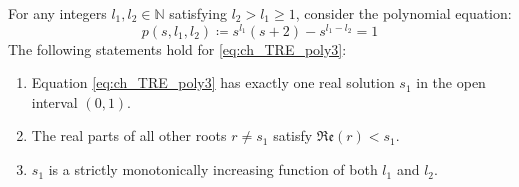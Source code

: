 \begin{lemma}\label{Lemma:ch_TRE_poly3}
For any integers $l_1, l_2 \in \mathbb{N}$ satisfying $l_2 > l_1 \ge 1$, consider the polynomial equation:
\begin{equation} \label{eq:ch_TRE_poly3}
	p(s, l_1, l_2) \coloneqq s^{l_1}(s+2) - s^{l_1-l_2} = 1
\end{equation}
The following statements hold for \eqref{eq:ch_TRE_poly3}:
\begin{enumerate}
	\item Equation \eqref{eq:ch_TRE_poly3} has exactly one real solution $s_1$ in the open interval $(0,1)$.
	\item The real parts of all other roots $r \neq s_1$ satisfy $\mathfrak{Re}(r) < s_1$.
	\item $s_1$ is a strictly monotonically increasing function of both $l_1$ and $l_2$.
\end{enumerate}
\end{lemma}
